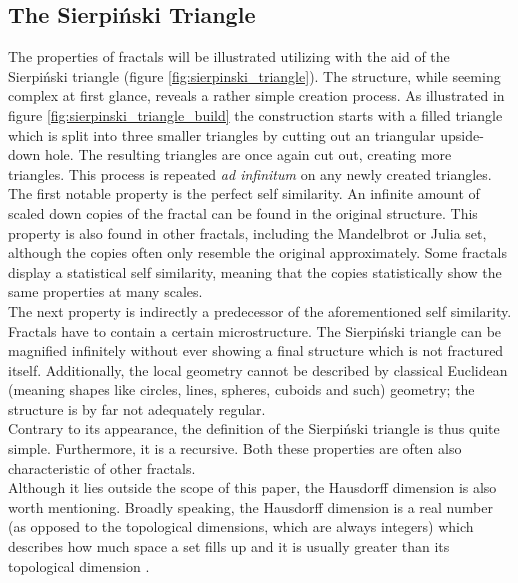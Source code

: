 \documentclass[10pt,a4paper,titlepage]{article}
\begin{document}
	\subsection{The Sierpiński Triangle}
	The properties of fractals will be illustrated utilizing with the aid of the Sierpiński triangle (figure \ref{fig:sierpinski_triangle}). The structure, while seeming complex at first glance, reveals a rather simple creation process. As illustrated in figure \ref{fig:sierpinski_triangle_build} the construction starts with a filled triangle which is split into three smaller triangles by cutting out an triangular upside-down hole. The resulting triangles are once again cut out, creating more triangles. This process is repeated \emph{ad infinitum} on any newly created triangles. \\
	The first notable property is the perfect self similarity. An infinite amount of scaled down copies of the fractal can be found in the original structure. This property is also found in other fractals, including the Mandelbrot or Julia set, although the copies often only resemble the original approximately. Some fractals display a statistical self similarity, meaning that the copies statistically show the same properties at many scales.\\
	The next property is indirectly a predecessor of the aforementioned self similarity. Fractals have to contain a certain microstructure. The Sierpiński triangle can be magnified infinitely without ever showing a final structure which is not fractured itself. Additionally, the local geometry cannot be described by classical Euclidean (meaning shapes like circles, lines, spheres, cuboids and such) geometry; the structure is by far not adequately regular.\\
	Contrary to its appearance, the definition of the Sierpiński triangle is thus quite simple. Furthermore, it is a recursive. Both these properties are often also characteristic of other fractals.\\
	Although it lies outside the scope of this paper, the Hausdorff dimension is also worth mentioning. Broadly speaking, the Hausdorff dimension is a real number (as opposed to the topological dimensions, which are always integers) which describes how much space a set fills up and it is usually greater than its topological dimension \cite[Einleitung]{FalconerKennethJ1993FG:m}.
	
\end{document}
